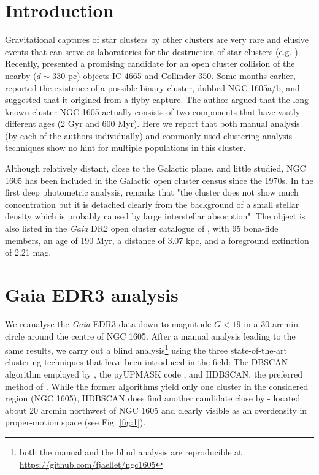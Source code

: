 \documentclass[RNAAS]{aastex631}
\begin{document}
\section{Introduction}
Gravitational captures of star clusters by other clusters are very rare and elusive events that can serve as laboratories for the destruction of star clusters (e.g. \citealt{Soubiran2018, Casado2022}). Recently, \citet{Piatti2022} presented a promising candidate for an open cluster collision of the nearby ($d\sim330$ pc) objects IC 4665 and Collinder 350.
Some months earlier, \citet{Camargo2021} reported the existence of a possible binary cluster, dubbed NGC 1605a/b, and suggested that it origined from a flyby capture. The author argued that the long-known cluster NGC 1605 actually consists of two components that have vastly different ages (2 Gyr and 600 Myr). Here we report that both manual analysis (by each of the authors individually) and commonly used clustering analysis techniques show no hint for multiple populations in this cluster.

Although relatively distant, close to the Galactic plane, and little studied, NGC 1605 has been included in the Galactic open cluster census since the 1970s. In the first deep photometric analysis, \citet{Fang1970} remarks that "the cluster does not show much concentration but it is detached clearly from the background of a small stellar density which is probably caused by large interstellar absorption". %
The object is also listed in the {\it Gaia} DR2 open cluster catalogue of \citet{Cantat2020}, with 95 bona-fide members, an age of 190 Myr, a distance of 3.07 kpc, and a foreground extinction of 2.21 mag.

\section{Gaia EDR3 analysis}
We reanalyse the {\it Gaia} EDR3 data \citep{Gaia2021} down to magnitude $G<19$ in a 30 arcmin circle around the centre of NGC 1605. After a manual analysis leading to the same results, we carry out a blind analysis\footnote{both the manual and the blind analysis are reproducible at \url{https://github.com/fjaellet/ngc1605}} using the three state-of-the-art clustering techniques that have been introduced in the field: The DBSCAN algorithm employed by \citet{Castro2022}, the pyUPMASK code \citep{Pera2021}, and HDBSCAN, the preferred method of \citet{Hunt2021}. 
While the former algorithms yield only one cluster in the considered region (NGC 1605), HDBSCAN does find another candidate close by - located about 20 arcmin northwest of NGC 1605 and clearly visible as an overdensity in proper-motion space (see Fig. \ref{fig:1}).
\end{document}

